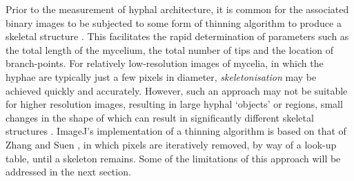 Prior to the measurement of hyphal architecture, it is common for the associated binary images to be subjected to some form of thinning algorithm to produce a skeletal structure \cite{spohr1998,tucker1992,denser-pamboukian2002}. This facilitates the rapid determination of parameters such as the total length of the mycelium, the total number of tips and the location of branch-points. For relatively low-resolution images of mycelia, in which the hyphae are typically just a few pixels in diameter, \emph{skeletonisation} may be achieved quickly and accurately. However, such an approach may not be suitable for higher resolution images, resulting in large hyphal \lq objects' or regions, small changes in the shape of which can result in significantly different skeletal structures \cite{sonka1993}. ImageJ's implementation of a thinning algorithm is based on that of Zhang and Suen \cite{zhang1984}, in which pixels are iteratively removed, by way of a look-up table, until a skeleton remains. Some of the limitations of this approach will be addressed in the next section.